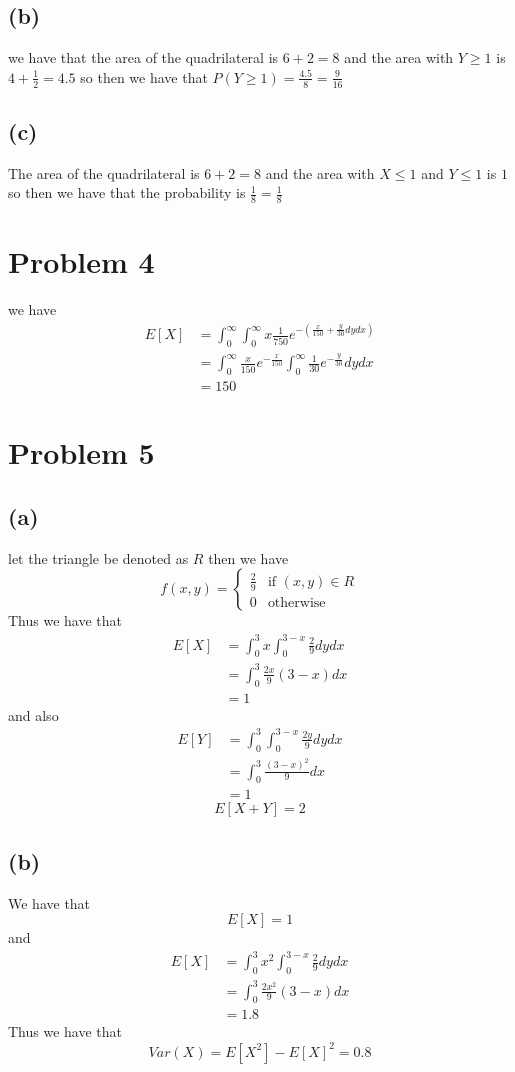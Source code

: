 \subsection*{(b)}
we have that the area of the quadrilateral is $6+2=8$ and
the area with $Y\geq 1$ is $4+\frac{1}{2}=4.5$ so then we have that 
$P(Y\geq 1)=\frac{4.5}{8}=\boxed{\frac{9}{16}}$
\subsection*{(c)}
The area of the quadrilateral is $6+2=8$ and the area with $X\leq 1$ and $Y\leq 1$ is $1$ so then we have that
the probability is $\frac{1}{8}=\boxed{\frac{1}{8}}$
\section*{Problem 4}
we have 
\begin{align*}
    E[X]&=\int_{0}^{\infty}\int_{0}^{\infty}x\frac{1}{750}e^{-\left(\frac{x}{150}+\frac{y}{30}dydx\right)}\\
    &=\int_{0}^{\infty}\frac{x}{150}e^{-\frac{x}{150}}\int_{0}^{\infty}\frac{1}{30}e^{-\frac{y}{30}}dydx\\
    &=\boxed{150}
\end{align*}
\section*{Problem 5}
\subsection*{(a)}
let the triangle be denoted as $R$ then we have
$$f(x,y)=\begin{cases}
    \frac{2}{9} & \text{if } (x,y)\in R\\
    0 & \text{otherwise}
\end{cases}$$
Thus we have that
\begin{align*}
    E[X]&=\int_{0}^{3}x\int_{0}^{3-x}\frac{2}{9}dydx\\
    &=\int_{0}^{3}\frac{2x}{9}(3-x)dx\\
    &=\boxed{1}
\end{align*}
and also
\begin{align*}
    E[Y]&=\int_{0}^{3}\int_{0}^{3-x}\frac{2y}{9}dydx\\
    &=\int_{0}^{3}\frac{(3-x)^2}{9}dx\\
    &=\boxed{1}
\end{align*}
$$E[X+Y]=\boxed{2}$$
\subsection*{(b)}
We have that 
$$E[X]=1$$
and 
\begin{align*}
    E[X]&=\int_{0}^{3}x^2\int_{0}^{3-x}\frac{2}{9}dydx\\
    &=\int_{0}^{3}\frac{2x^2}{9}(3-x)dx\\
    &=\boxed{1.8}
\end{align*}
Thus we have that
$$Var(X)=E[X^2]-E[X]^2=\boxed{0.8}$$
